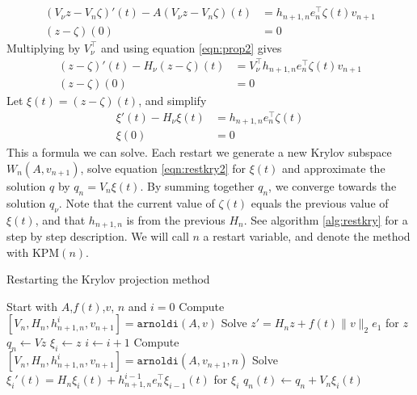 \begin{equation*}%
\begin{aligned}
 (V_\nu z-V_n \zeta)'(t)-A (V_\nu z-V_n \zeta)(t) &=  h_{n+1,n}e_n^\top \zeta(t) v_{n+1}  \\
(z-\zeta)(0)& = 0
\end{aligned}
\end{equation*}
Multiplying by $V_\nu^{\top}$ and using equation \eqref{eqn:prop2} gives
\begin{equation*}
\begin{aligned}
 (z-\zeta)'(t)-H_\nu (z-\zeta)(t) &= V_\nu^\top h_{n+1,n}e_n^\top \zeta(t) v_{n+1}  \\
(z-\zeta)(0)& = 0
\end{aligned}
\end{equation*}
Let $\xi(t) = (z-\zeta)(t)$, and simplify
\begin{equation}\label{eqn:restkry2}
\begin{aligned}
 \xi '(t) -H_\nu \xi(t) &= h_{n+1,n}e_n^\top \zeta (t)  \\
\xi(0)& = 0
\end{aligned}
\end{equation}
This a formula we can solve. Each restart we generate a new Krylov subspace $W_n(A,v_{n+1})$, solve equation \eqref{eqn:restkry2} for $\xi(t)$ and approximate the solution $q$ by $ q_n =  V_n\xi(t)$. By summing together $q_n$, we converge towards the solution $q_\nu$. Note that the current value of $\zeta(t)$ equals the previous value of $\xi(t)$, and that $h_{n+1,n}$ is from the previous $H_n$. See algorithm \ref{alg:restkry} for a step by step description. We will call $n$ a restart variable, and denote the method with KPM$(n)$.
\begin{algorithm}
\begin{algorithmic} \caption{Restarting the Krylov projection method} \label{alg:restkry} 
\STATE Start with $A$,$f(t)$,$v$, $n$ and $i = 0$
\STATE Compute $[V_n,H_n,h_{n+1,n}^i,v_{n+1}] = \texttt{arnoldi}(A,v)$
\STATE Solve $  z' = H_n z + f(t) \| v \|_2 e_1  $ for $z$
\STATE $ q_n \leftarrow  V z $
\STATE $\xi_i \leftarrow z$
    \STATE $i \leftarrow i + 1$
    \STATE Compute $[V_n,H_n,h_{n+1,n}^i,v_{n+1}] = \texttt{arnoldi}(A,v_{n+1},n)$
    \STATE Solve $ \xi_i'(t) = H_n \xi_i(t) + h_{n+1,n}^{i-1}e_n^\top \xi_{i-1}(t)  $ for $\xi_i$
    \STATE $ q_n(t) \leftarrow q_n + V_n \xi_i(t) $
\ENDWHILE
\end{algorithmic} 
\end{algorithm}

